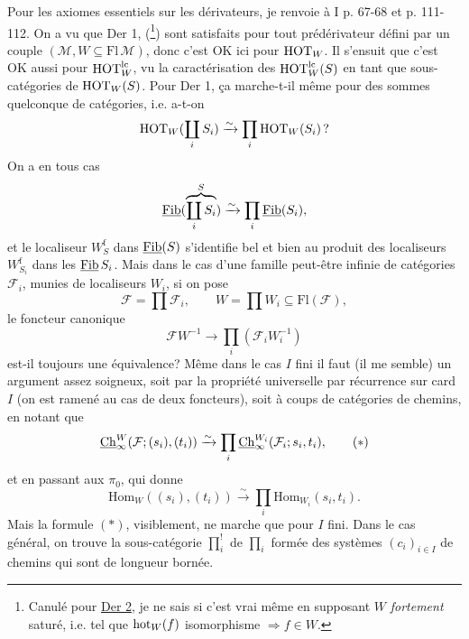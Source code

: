 Pour les axiomes essentiels sur les dérivateurs, je renvoie à I p. 67-68 et p. 111-112. On a vu que Der 1,  (\footnote[66]{Canulé pour \underline{Der 2}, je ne sais si c'est vrai même en supposant $W$ \textit{fortement} saturé, i.e. tel que $\mathrm{hot}_W(f)$ isomorphisme $\Longrightarrow f\in W$.}) sont satisfaits pour tout prédérivateur défini par un couple $(\mathcal{M},W\subseteq\mathrm{Fl}\,\mathcal{M})$, donc c'est OK ici pour $\mathrm{HOT}_W$. Il s'ensuit que c'est OK aussi pour $\mathrm{HOT}_W^{\mathrm{lc}}$, vu la caractérisation des $\mathrm{HOT}_W^{\mathrm{lc}}(S)$ en tant que sous-catégories de $\mathrm{HOT}_W(S)$. Pour Der 1, ça marche-t-il même pour des sommes quelconque de catégories, i.e. a-t-on %
\[ \mathrm{HOT}_W(\coprod_i S_i) \xrightarrow{\sim} \prod_i \mathrm{HOT}_W(S_i)\,? \]
On a en tous cas
\[ \underline{\mathrm{Fib}}(\overbrace{\coprod\limits_i S_i}^{S}) \xrightarrow{\sim} \prod_i \underline{\mathrm{Fib}}(S_i), \]
et le localiseur $W_S^{\mathrm{f}}$ dans $\underline{\mathrm{Fib}}(S)$ s'identifie
bel et bien au produit des localiseurs $W_{S_i}^{\mathrm{f}}$ dans les $\underline{\mathrm{Fib}}\,S_i$. Mais dans le cas d'une famille peut-être infinie de catégories $\mathcal{F}_i$, munies de localiseurs $W_i$, si on pose
\[ \mathcal{F} = \prod\mathcal{F}_i, \qquad W = \prod W_i \subseteq \mathrm{Fl}(\mathcal{F}), \]
le foncteur canonique
\[ \mathcal{F}W^{-1} \longrightarrow \prod_i(\mathcal{F}_iW_i^{-1}) \]
est-il toujours une équivalence? Même dans le cas $I$ fini il faut (il me semble) un argument assez soigneux, soit par la propriété universelle par récurrence sur card\,$I$ (on est ramené au cas de deux foncteurs), soit à coups de catégories de chemins, en notant que
\[ \uCh_\infty^W(\mathcal{F};(s_i),(t_i)) \xrightarrow{\sim} \prod_i \uCh_\infty^{W_i}(\mathcal{F}_i;s_i,t_i), \tag*{$(*)$} \]
et en passant aux $\pi_0$, qui donne
\[ \mathrm{Hom}_W((s_i),(t_i)) \xrightarrow{\sim} \prod_i \mathrm{Hom}_{W_i}(s_i,t_i). \]
Mais la formule $(*)$, visiblement, ne marche que pour $I$ fini. Dans le cas général, on trouve la sous-catégorie $\prod_i^!$ de $\prod_i$ formée des systèmes $(c_i)_{i\in I}$ de chemins qui sont de longueur bornée.

